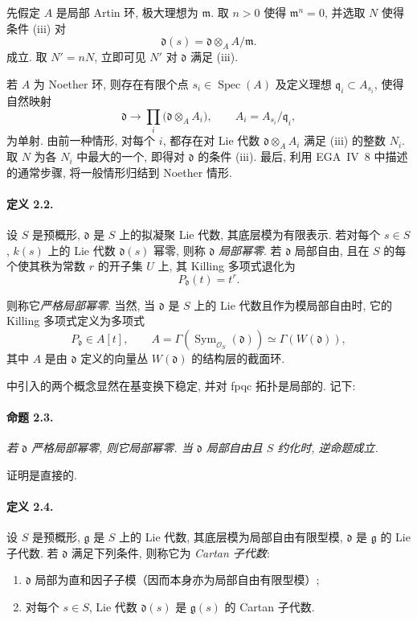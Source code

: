 先假定 \(A\) 是局部 Artin 环, 极大理想为 \(\mathfrak m\). 取 \(n>0\) 使得 \(\mathfrak m^n=0\), 并选取 \(N\) 使得条件 \textup{(iii)} 对
\[
  \mathfrak d(s)=\mathfrak d\otimes_A A/\mathfrak m.
\]
成立. 取 \(N'=nN\), 立即可见 \(N'\) 对 \(\mathfrak d\) 满足 \textup{(iii)}.

若 \(A\) 为 Noether 环, 则存在有限个点 \(s_i\in\operatorname{Spec}(A)\) 及定义理想 \(\mathfrak q_i\subset A_{s_i}\), 使得自然映射
\[
  \mathfrak d\longrightarrow
  \prod_i\bigl(\mathfrak d\otimes_A A_i\bigr),
  \qquad A_i=A_{s_i}/\mathfrak q_i,
\]
为单射. 由前一种情形, 对每个 \(i\), 都存在对 Lie 代数 \(\mathfrak d\otimes_A A_i\) 满足 \textup{(iii)} 的整数 \(N_i\). 取 \(N\) 为各 \(N_i\) 中最大的一个, 即得对 \(\mathfrak d\) 的条件 \textup{(iii)}. 最后, 利用 EGA~IV~8 中描述的通常步骤, 将一般情形归结到 Noether 情形.

\paragraph{\textbf{定义 2.2.}}
设 \(S\) 是预概形, \(\mathfrak d\) 是 \(S\) 上的拟凝聚 Lie 代数, 其底层模为有限表示. 若对每个 \(s\in S\), \(k(s)\) 上的 Lie 代数 \(\mathfrak d(s)\) 幂零, 则称 \(\mathfrak d\) \emph{局部幂零}. 若 \(\mathfrak d\) 局部自由, 且在 \(S\) 的每个使其秩为常数 \(r\) 的开子集 \(U\) 上, 其 Killing 多项式退化为
\[
  P_{\mathfrak d}(t)=t^r.
\]

则称它\emph{严格局部幂零}.
当然, 当 \(\mathfrak d\) 是 \(S\) 上的 Lie 代数且作为模局部自由时, 它的 Killing 多项式定义为多项式
\[
  P_{\mathfrak d}\in A[t],
  \qquad
  A=\Gamma\!\left(\operatorname{Sym}_{\mathcal O_S}(\mathfrak d)\right)
   \simeq \Gamma\!\left(W(\mathfrak d)\right),
\]
其中 \(A\) 是由 \(\mathfrak d\) 定义的向量丛 \(W(\mathfrak d)\) 的结构层的截面环.

 中引入的两个概念显然在基变换下稳定, 并对 fpqc 拓扑是局部的. 记下:

\paragraph{\textbf{命题 2.3.}}
\emph{若 \(\mathfrak d\) 严格局部幂零, 则它局部幂零. 当 \(\mathfrak d\) 局部自由且 \(S\) 约化时, 逆命题成立.}

证明是直接的.

\paragraph{\textbf{定义 2.4.}}
设 \(S\) 是预概形, \(\mathfrak g\) 是 \(S\) 上的 Lie 代数, 其底层模为局部自由有限型模, \(\mathfrak d\) 是 \(\mathfrak g\) 的 Lie 子代数. 若 \(\mathfrak d\) 满足下列条件, 则称它为 \emph{Cartan 子代数}:
\begin{enumerate}
\item[\textup{\SGAInlineRefTarget{sga3:xiv:2.4:item:i}(i)}] \(\mathfrak d\) 局部为直和因子子模\textup{（因而本身亦为局部自由有限型模）};
\item[\textup{(ii)}] 对每个 \(s\in S\), Lie 代数 \(\mathfrak d(s)\) 是 \(\mathfrak g(s)\) 的 Cartan 子代数.
\end{enumerate}

